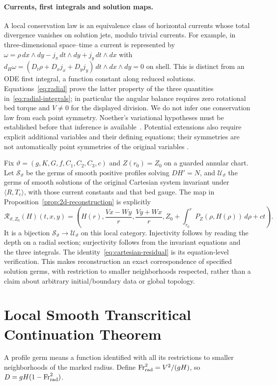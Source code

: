 \documentclass[12pt,a4paper,oneside]{report}
\numberwithin{equation}{chapter}
\theoremstyle{remark}\newtheorem{remark}[theorem]{Remark}
\begin{document}
\paragraph{Currents, first integrals and solution maps.}
A local conservation law is an equivalence class of horizontal currents
whose total divergence vanishes on solution jets, modulo trivial currents.
For example, in three-dimensional space--time a current is represented by
$\omega=\rho\,dx\wedge dy-j_x\,dt\wedge dy+j_y\,dt\wedge dx$ with
$d_H\omega=(D_t\rho+D_xj_x+D_yj_y)\,dt\wedge dx\wedge dy=0$ on shell.
This is distinct from an ODE first integral, a function constant along
reduced solutions. Equations~\eqref{eq:radial} prove the latter property of
the three quantities in~\eqref{eq:radial-integrals}; in particular the angular
balance requires zero rotational bed torque and $V\ne0$ for the displayed
division. We do not infer one conservation law from each point symmetry.
Noether's variational hypotheses must be established before that inference
is available~\cite{noether1918}. Potential extensions also require explicit
additional variables and their defining equations; their symmetries are
not automatically point symmetries of the original variables
\cite{bluman2005}.

Fix $\vartheta=(g,K,G,f,C_1,C_2,C_3,c)$ and $Z(r_0)=Z_0$ on a guarded
annular chart. Let $\mathscr S_{\vartheta}$ be the germs of smooth positive
profiles solving $DH'=N$, and $\mathscr U_{\vartheta}$ the germs of smooth
solutions of the original Cartesian system invariant under
$\langle R,T_c\rangle$, with those current constants and that bed gauge.
The map in Proposition~\ref{prop:2d-reconstruction} is explicitly
\[
 \mathcal R_{\vartheta,Z_0}(H)(t,x,y)=
 \left(H(r),\frac{Vx-Wy}{r},\frac{Vy+Wx}{r},
 Z_0+\int_{r_0}^rP_Z(\rho,H(\rho))\,d\rho+ct\right).
\]
It is a bijection $\mathscr S_{\vartheta}\to\mathscr U_{\vartheta}$ on this
local category. Injectivity follows by reading the depth on a radial
section; surjectivity follows from the invariant equations and the three
integrals. The identity~\eqref{eq:cartesian-residual} is its equation-level
verification. This makes reconstruction an exact correspondence of specified
solution germs, with restriction to smaller neighborhoods respected, rather
than a claim about arbitrary initial/boundary data or global topology.


\section{Local Smooth Transcritical Continuation Theorem}
A profile germ means a function identified with all its restrictions to
smaller neighborhoods of the marked radius. Define
$\mathrm{Fr}_{\rm rad}^2=V^2/(gH)$, so $D=gH(1-\mathrm{Fr}_{\rm rad}^2)$.
\end{document}
